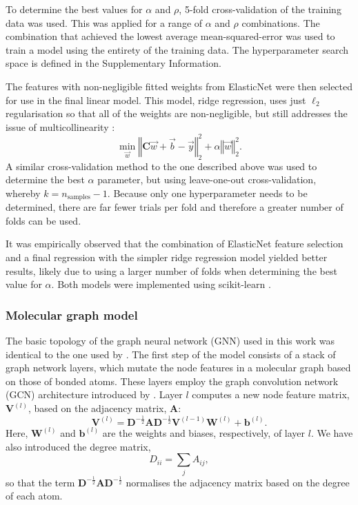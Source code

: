 To determine the best values for $\alpha$ and $\rho$, 5-fold cross-validation of
the training data was used. This was applied for a range of $\alpha$ and $\rho$
combinations. The combination that achieved the lowest average
mean-squared-error was used to train a model using the entirety of the training
data. The hyperparameter search space is defined in the Supplementary
Information.

The features with non-negligible fitted weights from ElasticNet were then
selected for use in the final linear model. This model, ridge regression, uses
just $\ell_2$ regularisation so that all of the weights are non-negligible, but
still addresses the issue of multicollinearity
\cite{mcdonaldRidgeRegression2009}:
\begin{equation}
    \min_{\vec{w}} \left \Vert \mathbf{C} \vec{w} + \vec{b} - \vec{y} \right \Vert_2^2 + \alpha \left \Vert \vec{w}\right \Vert_2^2.
\end{equation}
A similar cross-validation method to the one described above was used to
determine the best $\alpha$ parameter, but using leave-one-out cross-validation,
whereby $k=n_\text{samples}-1$. Because only one hyperparameter needs to be
determined, there are far fewer trials per fold and therefore a greater number
of folds can be used.

It was empirically observed that the combination of ElasticNet feature selection and a final regression with the simpler ridge regression model yielded better results, likely due to using a larger number of folds when determining the best value for $\alpha$. Both models were implemented using scikit-learn \cite{pedregosaScikitlearnMachineLearning2011}.

\subsubsection{Molecular graph model}

The basic topology of the graph neural network (GNN) used in this work was
identical to the one used by \citet{qinPredictingCriticalMicelle2021}. The first
step of the model consists of a stack of graph network layers, which mutate the
node features in a molecular graph based on those of bonded atoms. These layers
employ the graph convolution network (GCN) architecture introduced by
\citet{kipfSemiSupervisedClassificationGraph2017}. Layer $l$ computes a new node
feature matrix, $\mathbf{V}^{(l)}$, based on the adjacency matrix, $\mathbf{A}$:
\begin{equation}
    \mathbf{V}^{(l)} = \mathbf{D}^{-\frac{1}{2}} \mathbf{A} \mathbf{D}^{-\frac{1}{2}} \mathbf{V}^{(l-1)} \mathbf{W}^{(l)} + \mathbf{b}^{(l)}.
\end{equation}
Here, $\mathbf{W}^{(l)}$ and $\mathbf{b}^{(l)}$ are the weights and biases,
respectively, of layer $l$. We have also introduced the degree matrix,
\begin{equation}
    D_{ii} = \sum_j A_{ij},
\end{equation}
so that the term $\mathbf{D}^{-\frac{1}{2}} \mathbf{A} \mathbf{D}^{-\frac{1}{2}}$ normalises the
    adjacency matrix based on the degree of each atom.

